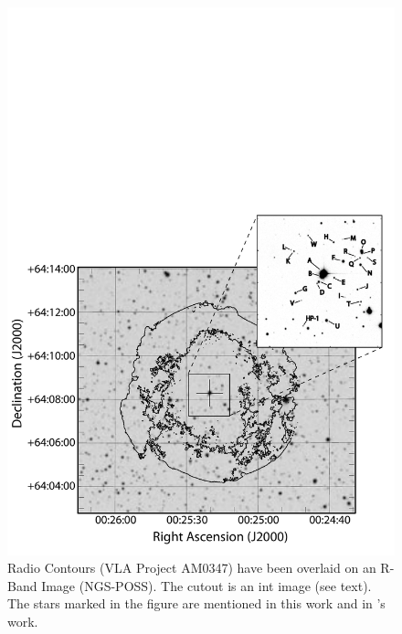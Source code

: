 \begin{figure}[h!]
\includegraphics*[width = \textwidth]{chapter_sn1572_starg/plots/overview.pdf}
\caption[SN 1572 overview of candidate stars]{Radio Contours (VLA Project AM0347) have been overlaid \citep{1996ASPC..101...80G} on an R-Band Image (NGS-POSS). The cutout is an \gls{int} image (see text). The stars marked in the figure are mentioned in this work and in \rl's work. }
\label{fig:overview}
\end{figure}

